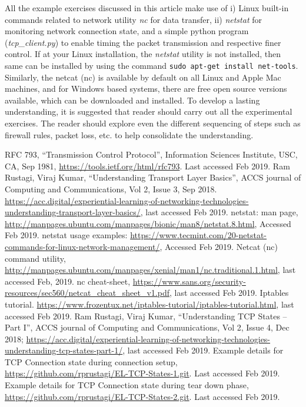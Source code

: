 \begin{multicols}{2}
All the example exercises discussed in this article make use of i) Linux built-in commands related to network utility \textit{nc} for data transfer, ii) \textit{netstat} for monitoring network connection state, and a simple python program (\textit{tcp\_client.py}) to enable timing the packet transmission and respective finer control. If at your Linux installation, the \textit{netstat} utility is not installed, then same can be installed by using the command \lstinline|sudo apt-get install net-tools|. Similarly, the netcat (nc) is available by default on all Linux and Apple Mac machines, and for Windows based systems, there are free open source versions available, which can be downloaded and installed. To develop a lasting understanding, it is suggested that reader should carry out all the experimental exercises. The reader should explore even the different sequencing of steps such as firewall rules, packet loss, etc. to help consolidate the understanding.

\begin{thebibliography}{99}
 RFC 793, ``Transmission Control Protocol'', Information Sciences Institute, USC, CA, Sep 1981, \url{https://tools.ietf.org/html/rfc793}. Last accessed Feb 2019.
 Ram Rustagi, Viraj Kumar, ``Understanding Transport Layer Basics'', ACCS journal of Computing and Communications, Vol 2, Issue 3, Sep 2018. \url{https://acc.digital/experiential-learning-of-networking-technologies-understanding-transport-layer-basics/}, last accessed Feb 2019.
 netstat: man page, \url{http://manpages.ubuntu.com/manpages/bionic/man8/netstat.8.html}, Accessed Feb 2019.
 netstat usage examples: \url{https://www.tecmint.com/20-netstat-commands-for-linux-network-management/}, Accessed Feb 2019.
 Netcat (nc) command utility, \url{http://manpages.ubuntu.com/manpages/xenial/man1/nc.traditional.1.html}, last accessed Feb, 2019.
 nc cheat-sheet, \url{https://www.sans.org/security-resources/sec560/netcat_cheat_sheet_v1.pdf}, last accessed Feb 2019.
 Iptables tutorial. \url{https://www.frozentux.net/iptables-tutorial/iptables-tutorial.html}, last accessed Feb 2019.
 Ram Rustagi, Viraj Kumar, ``Understanding TCP States -- Part I'', ACCS journal of Computing and Communications, Vol 2, Issue 4, Dec 2018; \url{https://acc.digital/experiential-learning-of-networking-technologies-understanding-tcp-states-part-1/}, last accessed Feb 2019.
 Example details for TCP Connection state during connection setup, \url{https://github.com/rprustagi/EL-TCP-States-1.git}. Last accessed Feb 2019.
 Example details for TCP Connection state during tear down phase, \url{https://github.com/rprustagi/EL-TCP-States-2.git}. Last accessed Feb 2019.
\end{thebibliography}
\end{multicols}

